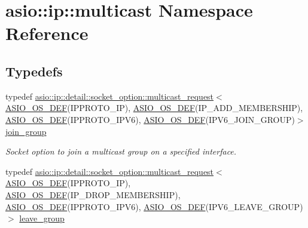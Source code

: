 \hypertarget{namespaceasio_1_1ip_1_1multicast}{}\section{asio\+:\+:ip\+:\+:multicast Namespace Reference}
\label{namespaceasio_1_1ip_1_1multicast}
\subsection*{Typedefs}
\begin{DoxyCompactItemize}
\item 
typedef \hyperlink{classasio_1_1ip_1_1detail_1_1socket__option_1_1multicast__request}{asio\+::ip\+::detail\+::socket\+\_\+option\+::multicast\+\_\+request}$<$ \hyperlink{socket__types_8hpp_a26e0208fa086ac48cf5af1b2a521c74a}{A\+S\+I\+O\+\_\+\+O\+S\+\_\+\+D\+E\+F}(I\+P\+P\+R\+O\+T\+O\+\_\+\+I\+P), \hyperlink{socket__types_8hpp_a26e0208fa086ac48cf5af1b2a521c74a}{A\+S\+I\+O\+\_\+\+O\+S\+\_\+\+D\+E\+F}(I\+P\+\_\+\+A\+D\+D\+\_\+\+M\+E\+M\+B\+E\+R\+S\+H\+I\+P), \hyperlink{socket__types_8hpp_a26e0208fa086ac48cf5af1b2a521c74a}{A\+S\+I\+O\+\_\+\+O\+S\+\_\+\+D\+E\+F}(I\+P\+P\+R\+O\+T\+O\+\_\+\+I\+P\+V6), \hyperlink{socket__types_8hpp_a26e0208fa086ac48cf5af1b2a521c74a}{A\+S\+I\+O\+\_\+\+O\+S\+\_\+\+D\+E\+F}(I\+P\+V6\+\_\+\+J\+O\+I\+N\+\_\+\+G\+R\+O\+U\+P)$>$ \hyperlink{namespaceasio_1_1ip_1_1multicast_af1296ad63123b3adc414c0bbeb328db3}{join\+\_\+group}
\begin{DoxyCompactList}\small\item\em Socket option to join a multicast group on a specified interface. \end{DoxyCompactList}\item 
typedef \hyperlink{classasio_1_1ip_1_1detail_1_1socket__option_1_1multicast__request}{asio\+::ip\+::detail\+::socket\+\_\+option\+::multicast\+\_\+request}$<$ \hyperlink{socket__types_8hpp_a26e0208fa086ac48cf5af1b2a521c74a}{A\+S\+I\+O\+\_\+\+O\+S\+\_\+\+D\+E\+F}(I\+P\+P\+R\+O\+T\+O\+\_\+\+I\+P), \hyperlink{socket__types_8hpp_a26e0208fa086ac48cf5af1b2a521c74a}{A\+S\+I\+O\+\_\+\+O\+S\+\_\+\+D\+E\+F}(I\+P\+\_\+\+D\+R\+O\+P\+\_\+\+M\+E\+M\+B\+E\+R\+S\+H\+I\+P), \hyperlink{socket__types_8hpp_a26e0208fa086ac48cf5af1b2a521c74a}{A\+S\+I\+O\+\_\+\+O\+S\+\_\+\+D\+E\+F}(I\+P\+P\+R\+O\+T\+O\+\_\+\+I\+P\+V6), \hyperlink{socket__types_8hpp_a26e0208fa086ac48cf5af1b2a521c74a}{A\+S\+I\+O\+\_\+\+O\+S\+\_\+\+D\+E\+F}(I\+P\+V6\+\_\+\+L\+E\+A\+V\+E\+\_\+\+G\+R\+O\+U\+P)$>$ \hyperlink{namespaceasio_1_1ip_1_1multicast_ae0f41e19e723749f6373383e45020844}{leave\+\_\+group}

\end{DoxyCompactItemize}
